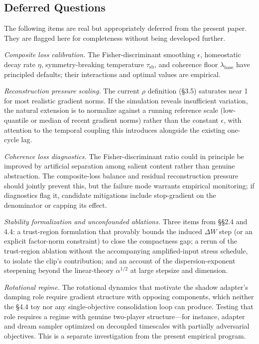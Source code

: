 \documentclass[11pt]{article}
\begin{document}
\subsection{Deferred Questions}

The following items are real but appropriately deferred from the present paper. They are flagged here for completeness without being developed further.

\textit{Composite loss calibration.} The Fisher-discriminant smoothing $\epsilon$, homeostatic decay rate $\eta$, symmetry-breaking temperature $\tau_\text{sb}$, and coherence floor $\lambda_\text{base}$ have principled defaults; their interactions and optimal values are empirical.

\textit{Reconstruction pressure scaling.} The current $\rho$ definition (\S 3.5) saturates near 1 for most realistic gradient norms. If the simulation reveals insufficient variation, the natural extension is to normalize against a running reference scale (low-quantile or median of recent gradient norms) rather than the constant $\epsilon$, with attention to the temporal coupling this introduces alongside the existing one-cycle lag.

\textit{Coherence loss diagnostics.} The Fisher-discriminant ratio could in principle be improved by artificial separation among salient content rather than genuine abstraction. The composite-loss balance and residual reconstruction pressure should jointly prevent this, but the failure mode warrants empirical monitoring; if diagnostics flag it, candidate mitigations include stop-gradient on the denominator or capping its effect.

\textit{Stability formalization and unconfounded ablations.} Three items from \S\S 2.4 and 4.4: a trust-region formulation that provably bounds the induced $\Delta W$ step (or an explicit factor-norm constraint) to close the compactness gap; a rerun of the trust-region ablation without the accompanying amplified-input stress schedule, to isolate the clip's contribution; and an account of the dispersion-exponent steepening beyond the linear-theory $\alpha^{1/2}$ at large stepsize and dimension.

\textit{Rotational regime.} The rotational dynamics that motivate the shadow adapter's damping role require gradient structure with opposing components, which neither the \S 4.4 toy nor any single-objective consolidation loop can produce. Testing that role requires a regime with genuine two-player structure---for instance, adapter and dream sampler optimized on decoupled timescales with partially adversarial objectives. This is a separate investigation from the present empirical program.
\end{document}
